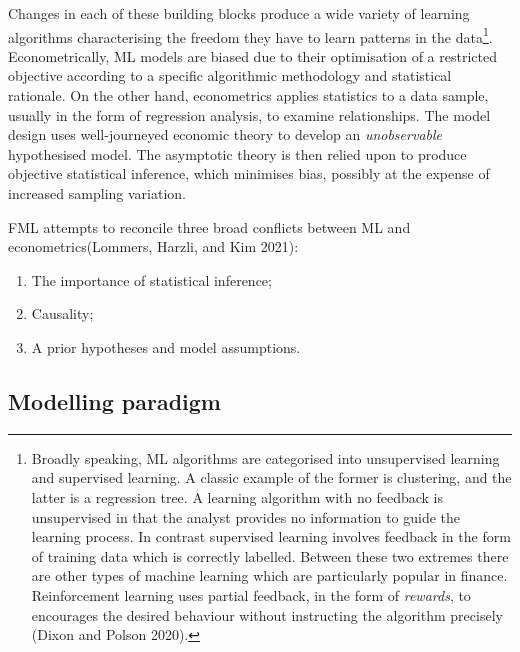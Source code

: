\documentclass{article}
\begin{document}
Changes in each of these building blocks produce a wide variety of
learning algorithms characterising the freedom they have to learn
patterns in the data\footnote{Broadly speaking, ML algorithms are
  categorised into unsupervised learning and supervised learning. A
  classic example of the former is clustering, and the latter is a
  regression tree. A learning algorithm with no feedback is unsupervised
  in that the analyst provides no information to guide the learning
  process. In contrast supervised learning involves feedback in the form
  of training data which is correctly labelled. Between these two
  extremes there are other types of machine learning which are
  particularly popular in finance. Reinforcement learning uses partial
  feedback, in the form of \emph{rewards}, to encourages the desired
  behaviour without instructing the algorithm precisely (Dixon and
  Polson 2020).}. Econometrically, ML models are biased due to their
optimisation of a restricted objective according to a specific
algorithmic methodology and statistical rationale. On the other hand,
econometrics applies statistics to a data sample, usually in the form of
regression analysis, to examine relationships. The model design uses
well-journeyed economic theory to develop an \emph{unobservable}
hypothesised model. The asymptotic theory is then relied upon to produce
objective statistical inference, which minimises bias, possibly at the
expense of increased sampling variation.

FML attempts to reconcile three broad conflicts between ML and
econometrics(Lommers, Harzli, and Kim 2021):

\begin{enumerate}
\def\labelenumi{\arabic{enumi}.}
\tightlist
\item
  The importance of statistical inference;
\item
  Causality;
\item
  A prior hypotheses and model assumptions.
\end{enumerate}

\hypertarget{modelling-paradigm}{%
\subsection{Modelling paradigm}\label{modelling-paradigm}}
\end{document}
